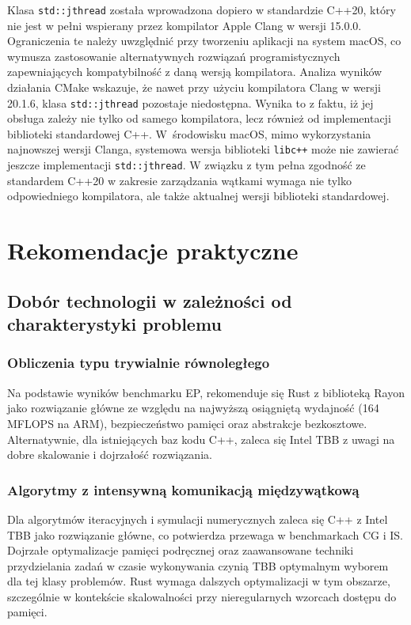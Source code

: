 Klasa \texttt{std::jthread} została wprowadzona dopiero w standardzie C++20, który nie jest w pełni wspierany przez kompilator Apple Clang w wersji 15.0.0. Ograniczenia te należy uwzględnić przy tworzeniu aplikacji na system macOS, co wymusza zastosowanie alternatywnych rozwiązań programistycznych zapewniających kompatybilność z daną wersją kompilatora. Analiza wyników działania CMake wskazuje, że nawet przy użyciu kompilatora Clang w wersji 20.1.6, klasa \texttt{std::jthread} pozostaje niedostępna. Wynika to z faktu, iż jej obsługa zależy nie tylko od samego kompilatora, lecz również od implementacji biblioteki standardowej C++. W~środowisku macOS, mimo wykorzystania najnowszej wersji Clanga, systemowa wersja biblioteki \texttt{libc++} może nie zawierać jeszcze implementacji \texttt{std::jthread}. W związku z tym pełna zgodność ze standardem C++20 w zakresie zarządzania wątkami wymaga nie tylko odpowiedniego kompilatora, ale także aktualnej wersji biblioteki standardowej.

\section{Rekomendacje praktyczne}

\subsection{Dobór technologii w zależności od charakterystyki problemu}

\subsubsection{Obliczenia typu trywialnie równoległego}

Na podstawie wyników benchmarku EP, rekomenduje się Rust z biblioteką Rayon jako rozwiązanie główne ze względu na najwyższą osiągniętą wydajność (164 MFLOPS na ARM), bezpieczeństwo pamięci oraz abstrakcje bezkosztowe. Alternatywnie, dla istniejących baz kodu C++, zaleca się Intel TBB z uwagi na dobre skalowanie i dojrzałość rozwiązania.

\subsubsection{Algorytmy z intensywną komunikacją międzywątkową}

Dla algorytmów iteracyjnych i symulacji numerycznych zaleca się C++ z Intel TBB jako rozwiązanie główne, co potwierdza przewaga w benchmarkach CG i IS. Dojrzałe optymalizacje pamięci podręcznej oraz zaawansowane techniki przydzielania zadań w czasie wykonywania czynią TBB optymalnym wyborem dla tej klasy problemów. Rust wymaga dalszych optymalizacji w tym obszarze, szczególnie w kontekście skalowalności przy nieregularnych wzorcach dostępu do pamięci.

